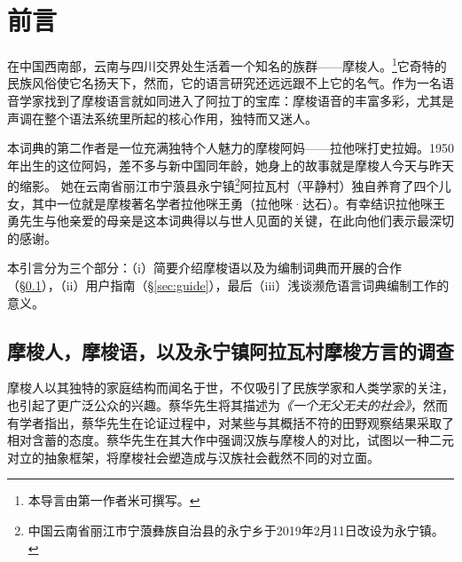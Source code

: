 \languecmncn

\chapter*{前言}


在中国西南部，云南与四川交界处生活着一个知名的族群——摩梭人。\footnote{本导言由第一作者米可撰写。}它奇特的民族风俗使它名扬天下，然而，它的语言研究还远远跟不上它的名气。作为一名语音学家找到了摩梭语言就如同进入了阿拉丁的宝库：摩梭语音的丰富多彩，尤其是声调在整个语法系统里所起的核心作用，独特而又迷人。

本词典的第二作者是一位充满独特个人魅力的摩梭阿妈——拉他咪打史拉姆。1950年出生的这位阿妈，差不多与新中国同年龄，她身上的故事就是摩梭人今天与昨天的缩影。
她在云南省丽江市宁蒗县永宁镇\footnote{中国云南省丽江市宁蒗彝族自治县的永宁乡于2019年2月11日改设为永宁镇。}阿拉瓦村（平静村）独自养育了四个儿女，其中一位就是摩梭著名学者拉他咪王勇（拉他咪·达石）。有幸结识拉他咪王勇先生与他亲爱的母亲是这本词典得以与世人见面的关键，在此向他们表示最深切的感谢。

本引言分为三个部分：（i）简要介绍摩梭语以及为编制词典而开展的合作（§\ref{sec:lang}），（ii）用户指南（§\ref{sec:guide}），最后（iii）浅谈濒危语言词典编制工作的意义。

\section{摩梭人，摩梭语，以及永宁镇阿拉瓦村摩梭方言的调查}
\label{sec:lang}

摩梭人以其独特的家庭结构而闻名于世，不仅吸引了民族学家和人类学家的关注，也引起了更广泛公众的兴趣。蔡华先生将其描述为\emph{《一个无父无夫的社会》}\parencite{cai1997}，然而有学者指出，蔡华先生在论证过程中，对某些与其概括不符的田野观察结果采取了相对含蓄的态度\parencite[147]{wellens2003}。蔡华先生在其大作中强调汉族与摩梭人的对比，试图以一种二元对立的抽象框架，将摩梭社会塑造成与汉族社会截然不同的对立面\parencite{cai2008}。

